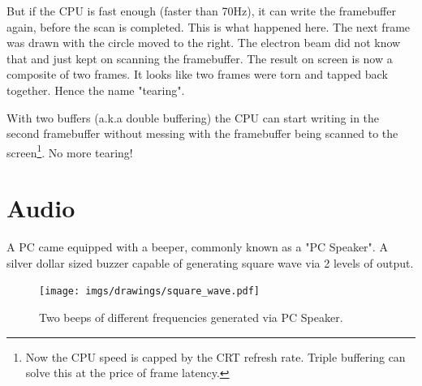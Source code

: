 \documentclass[book.tex]{subfiles}
\begin{document}
\par
But if the CPU is fast enough (faster than 70Hz), it can write the framebuffer again, before the scan is completed. This is what happened here. The next frame was drawn with the circle moved to the right. The electron beam did not know that and just kept on scanning the framebuffer. The result on screen is now a composite of two frames. It looks like two frames were torn and tapped back together. Hence the name "tearing".\\
\par
With two buffers (a.k.a double buffering) the CPU can start writing in the second framebuffer without messing with the framebuffer being scanned to the screen\footnote{Now the CPU speed is capped by the CRT refresh rate. Triple buffering can solve this at the price of frame latency.}. No more tearing!
















\section{Audio}
A PC came equipped with a beeper, commonly known as a "PC Speaker". A silver dollar sized buzzer capable of generating square wave via 2 levels of output.\\
\par
 \begin{figure}[H]
\centering
\texttt{[image: imgs/drawings/square\_wave.pdf]}
\caption{Two beeps of different frequencies generated via PC Speaker.}
\end{figure}
\end{document}
